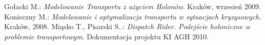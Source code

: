 \begin{thebibliography}{2}
  Gołacki M.:
  \emph{Modelowanie Transportu z użyciem Holonów}. Kraków, wrzesień 2009.
  Konieczny M.:
  \emph{Modelowanie i optymalizacja transportu w sytuacjach kryzysowych}. Kraków, 2008.
  Miąsko T., Pisarski S..:
  \emph{Dispatch Rider. Podejście holoniczne w problemie transportowym}. Dokumentacja projektu KI AGH 2010.
  
\end{thebibliography}
